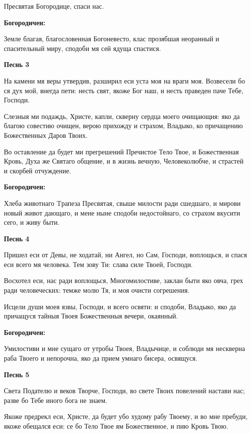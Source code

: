Пресвятая Богородице, спаси нас.


\medskip
\bfseries Богородичен:\normalfont{}

Земле благая, благословенная Богоневесто, клас прозябшая неоранный и спасительный миру, сподоби мя сей ядуща спастися.


\medskip
\bfseries Песнь 3\normalfont{}


На камени мя веры утвердив, разширил еси уста моя на враги моя. Возвесели бо ся дух мой, внегда пети: несть свят, якоже Бог наш, и несть праведен паче Тебе, Господи.


Слезныя ми подаждь, Христе, капли, скверну сердца моего очищающия: яко да благою совестию очищен, верою прихожду и страхом, Владыко, ко причащению Божественных Даров Твоих.


Во оставление да будет ми прегрешений Пречистое Тело Твое, и Божественная Кровь, Духа же Святаго общение, и в жизнь вечную, Человеколюбче, и страстей и скорбей отчуждение.


\medskip
\bfseries Богородичен:\normalfont{}

Хлеба животнаго Tрапеза Пресвятая, свыше милости ради сшедшаго, и мирови новый живот дающаго, и мене ныне сподоби недостойнаго, со страхом вкусити сего, и живу быти.


\medskip
\bfseries Песнь 4\normalfont{}


Пришел еси от Девы, не ходатай, ни Ангел, но Сам, Господи, воплощься, и спася еси всего мя человека. Тем зову Ти: слава силе Твоей, Господи.


Восхотел еси, нас ради воплощься, Многомилостиве, заклан быти яко овча, грех ради человеческих: темже молю Тя, и моя очисти согрешения.


Исцели души моея язвы, Господи, и всего освяти: и сподоби, Владыко, яко да причащуся тайныя Твоея Божественныя вечери, окаянный.


\medskip
\bfseries Богородичен:\normalfont{}

Умилостиви и мне сущаго от утробы Твоея, Владычице, и соблюди мя нескверна раба Твоего и непорочна, яко да прием умнаго бисера, освящуся.


\medskip
\bfseries Песнь 5\normalfont{}


Света Подателю и веков Творче, Господи, во свете Твоих повелений настави нас; разве бо Тебе иного бога не знаем.


Якоже предрекл еси, Христе, да будет убо худому рабу Твоему, и во мне пребуди, якоже обещался еси: се бо Тело Твое ям Божественное, и пию Кровь Твою.


